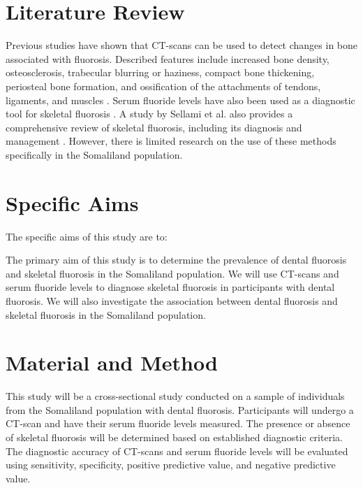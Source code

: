 \documentclass{article}
\begin{document}


\section{Literature Review}
Previous studies have shown that CT-scans can be used to detect changes in bone associated with fluorosis. Described features include increased bone density, osteosclerosis, trabecular blurring or haziness, compact bone thickening, periosteal bone formation, and ossification of the attachments of tendons, ligaments, and muscles \cite{radiopaedia}. Serum fluoride levels have also been used as a diagnostic tool for skeletal fluorosis \cite{medindia}. A study by Sellami et al. also provides a comprehensive review of skeletal fluorosis, including its diagnosis and management \cite{sellami}.
However, there is limited research on the use of these methods specifically in the Somaliland population.

\section{Specific Aims}
The specific aims of this study are to:

\begin{outline} 
\1 The primary aim of this study is to determine the prevalence of dental fluorosis and skeletal fluorosis in the Somaliland population. 
\1 We will use CT-scans and serum fluoride levels to diagnose skeletal fluorosis in participants with dental fluorosis. 
\1 We will also investigate the association between dental fluorosis and skeletal fluorosis in the Somaliland population. 
\end{outline}


\section{Material and Method}
This study will be a cross-sectional study conducted on a sample of individuals from the Somaliland population with dental fluorosis. Participants will undergo a CT-scan and have their serum fluoride levels measured. The presence or absence of skeletal fluorosis will be determined based on established diagnostic criteria. The diagnostic accuracy of CT-scans and serum fluoride levels will be evaluated using sensitivity, specificity, positive predictive value, and negative predictive value.
\end{document}
